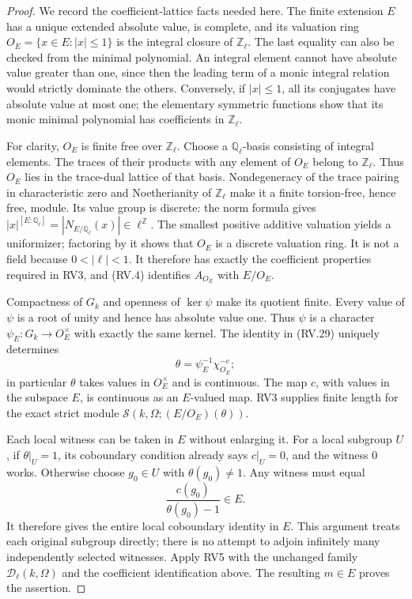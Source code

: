 \begin{proof}
We record the coefficient-lattice facts needed here.
The finite extension $E$ has a unique extended absolute value,
is complete, and its valuation ring
$O_E=\{x\in E:|x|\le1\}$ is the integral closure of
$\mathbb Z_\ell$.
The last equality can also be checked from the minimal polynomial.
An integral element cannot have absolute value greater than one,
since then the leading term of a monic integral relation would
strictly dominate the others.
Conversely, if $|x|\le1$, all its conjugates have absolute value
at most one; the elementary symmetric functions show that its
monic minimal polynomial has coefficients in $\mathbb Z_\ell$.

For clarity, $O_E$ is finite free over $\mathbb Z_\ell$.
Choose a $\mathbb Q_\ell$-basis consisting of integral elements.
The traces of their products with any element of $O_E$ belong
to $\mathbb Z_\ell$.
Thus $O_E$ lies in the trace-dual lattice of that basis.
Nondegeneracy of the trace pairing in characteristic zero and
Noetherianity of $\mathbb Z_\ell$ make it a finite torsion-free,
hence free, module.
Its value group is discrete: the norm formula gives
$|x|^{[E:\mathbb Q_\ell]}
=|N_{E/\mathbb Q_\ell}(x)|\in\ell^{\mathbb Z}$.
The smallest positive additive valuation yields a uniformizer;
factoring by it shows that $O_E$ is a discrete valuation ring.
It is not a field because $0<|\ell|<1$.
It therefore has exactly the coefficient properties required in RV3,
and (RV.4) identifies $A_{O_E}$ with $E/O_E$.

Compactness of $G_k$ and openness of $\ker\psi$ make its quotient
finite.  Every value of $\psi$ is a root of unity and hence has
absolute value one.  Thus $\psi$ is a character
$\psi_E:G_k\to O_E^\times$ with exactly the same kernel.
The identity in (RV.29) uniquely determines
\[
                    \theta=\psi_E^{-1}\chi_{O_E}^{-e};
 \tag{RV.30}
\]
in particular $\theta$ takes values in $O_E^\times$ and is continuous.
The map $c$, with values in the subspace $E$, is continuous as
an $E$-valued map.
RV3 supplies finite length for the exact strict module
$\mathcal S(k,\Omega;(E/O_E)(\theta))$.

Each local witness can be taken in $E$ without enlarging it.
For a local subgroup $U$, if $\theta|_U=1$, its coboundary
condition already says $c|_U=0$, and the witness $0$ works.
Otherwise choose $g_0\in U$ with $\theta(g_0)\ne1$.
Any witness must equal
\[
                         \frac{c(g_0)}{\theta(g_0)-1}\in E.
 \tag{RV.31}
\]
It therefore gives the entire local coboundary identity in $E$.
This argument treats each original subgroup directly; there is no
attempt to adjoin infinitely many independently selected witnesses.
Apply RV5 with the unchanged family
$\mathscr D_\ell(k,\Omega)$ and the coefficient identification
above.  The resulting $m\in E$ proves the assertion.
\end{proof}

